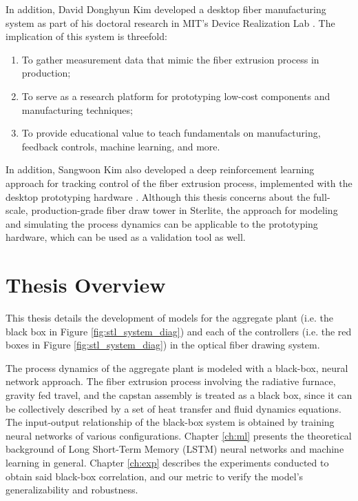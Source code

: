 In addition, David Donghyun Kim developed a desktop fiber manufacturing system as part of his doctoral research in MIT's Device Realization Lab \cite{ddkim_phdthesis}. The implication of this system is threefold: 
\begin{enumerate}
    \item To gather measurement data that mimic the fiber extrusion process in production;
    \item To serve as a research platform for prototyping low-cost components and manufacturing techniques;
    \item To provide educational value to teach fundamentals on manufacturing, feedback controls, machine learning, and more.
\end{enumerate}

In addition, Sangwoon Kim also developed a deep reinforcement learning approach for tracking control of the fiber extrusion process, implemented with the desktop prototyping hardware \cite{sangwoon}. Although this thesis concerns about the full-scale, production-grade fiber draw tower in Sterlite, the approach for modeling and simulating the process dynamics can be applicable to the prototyping hardware, which can be used as a validation tool as well.  


\section{Thesis Overview}\label{ch:intro:thesis_ov}

This thesis details the development of models for the aggregate plant (i.e. the black box in Figure \ref{fig:stl_system_diag}) and each of the controllers (i.e. the red boxes in Figure \ref{fig:stl_system_diag}) in the optical fiber drawing system. 

The process dynamics of the aggregate plant is modeled with a black-box, neural network approach. The fiber extrusion process involving the radiative furnace, gravity fed travel, and the capstan assembly is treated as a black box, since it can be collectively described by a set of heat transfer and fluid dynamics equations. The input-output relationship of the black-box system is obtained by training neural networks of various configurations. Chapter \ref{ch:ml} presents the theoretical background of Long Short-Term Memory (LSTM) neural networks and machine learning in general. Chapter \ref{ch:exp} describes the experiments conducted to obtain said black-box correlation, and our metric to verify the model's generalizability and robustness. 

